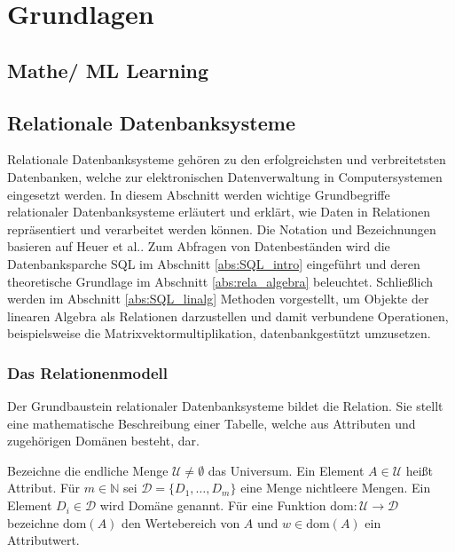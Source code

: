 \chapter{Grundlagen}

\section{Mathe/ ML Learning}

\section{Relationale Datenbanksysteme}
Relationale Datenbanksysteme gehören zu den erfolgreichsten und verbreitetsten Datenbanken, welche zur elektronischen Datenverwaltung in Computersystemen eingesetzt werden. In diesem Abschnitt werden wichtige Grundbegriffe relationaler Datenbanksysteme erläutert und erklärt, wie Daten in Relationen repräsentiert und verarbeitet werden können. Die Notation und Bezeichnungen basieren auf Heuer et al.\cite{DBLP:books/daglib/0044627}. Zum Abfragen von Datenbeständen wird die Datenbanksparche SQL im Abschnitt \ref{abs:SQL_intro} eingeführt und deren theoretische Grundlage im Abschnitt \ref{abs:rela_algebra} beleuchtet. Schließlich werden im Abschnitt \ref{abs:SQL_linalg} Methoden vorgestellt, um Objekte der linearen Algebra als Relationen darzustellen und damit verbundene Operationen, beispielsweise die Matrixvektormultiplikation, datenbankgestützt umzusetzen.

\subsection{Das Relationenmodell}
Der Grundbaustein relationaler Datenbanksysteme bildet die Relation. Sie stellt eine mathematische Beschreibung einer Tabelle, welche aus Attributen und zugehörigen Domänen besteht, dar.

\begin{defi}
    \label{def:universum}
    Bezeichne die endliche Menge $\mathcal{U} \neq \emptyset$ das Universum. Ein Element $A \in \mathcal{U}$ heißt Attribut. Für $m \in \mathbb{N}$ sei $\mathcal{D}=\{D_1, \ldots, D_m\}$ eine Menge nichtleere Mengen. Ein Element $D_i \in \mathcal{D}$ wird Domäne genannt. Für eine Funktion $\mathrm{dom}: \mathcal{U} \rightarrow \mathcal{D}$ bezeichne $\mathrm{dom}(A)$ den Wertebereich von $A$ und $w \in \mathrm{dom}(A)$ ein Attributwert.
\end{defi}

